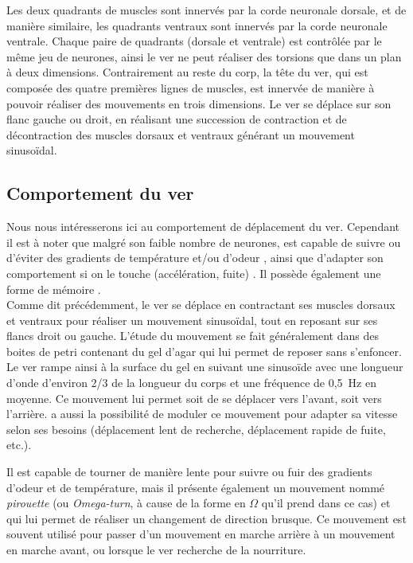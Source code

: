 Les deux quadrants de muscles sont innervés par la corde neuronale dorsale, et
de manière similaire, les quadrants ventraux sont innervés par la corde
neuronale ventrale. Chaque paire de quadrants (dorsale et ventrale) est
contrôlée par le même jeu de neurones, ainsi le ver ne peut réaliser des
torsions que dans un plan à deux dimensions. Contrairement au reste du corp, la
tête du ver, qui est composée des quatre premières lignes de muscles, est
innervée de manière à pouvoir réaliser des mouvements en trois dimensions. Le
ver se déplace sur son flanc gauche ou droit, en réalisant une succession de
contraction et de décontraction des muscles dorsaux et ventraux générant un
mouvement sinusoïdal.


\subsection{Comportement du ver} %
\label{sub:Comportement du ver}

Nous nous intéresserons ici au comportement de déplacement du ver. Cependant il est
à noter que malgré son faible nombre de neurones, \celeg{} est capable de
suivre ou d'éviter des gradients de température et/ou d'odeur
\cite{Ferree1999,Gray2005}, ainsi que d'adapter son comportement si on le touche
(accélération, fuite) \cite{Chalfie1985}. Il possède également une forme de
mémoire \cite{Rankin2005a}.\\

Comme dit précédemment, le ver se déplace en contractant ses muscles dorsaux et
ventraux pour réaliser un mouvement sinusoïdal, tout en reposant sur ses
flancs droit ou gauche. L'étude du mouvement se fait généralement dans des
boites de petri contenant du gel d'agar qui lui permet de reposer
sans s'enfoncer. Le ver rampe ainsi à la surface du gel en suivant une
sinusoïde avec une longueur d'onde d'environ 2/3 de la longueur du corps et 
une fréquence de 0,5~Hz en moyenne\cite{Boyle2009}. Ce mouvement lui permet
soit de se déplacer vers l'avant, soit vers l'arrière. \celeg{} a aussi la
possibilité de moduler ce mouvement pour adapter sa vitesse selon ses besoins
(déplacement lent de recherche, déplacement rapide de fuite, etc.).

Il est capable de tourner de manière lente pour suivre ou fuir des gradients
d'odeur et de température, mais il présente également un mouvement nommé
\textit{pirouette} (ou \textit{Omega-turn}, à cause de la forme en $\Omega$ qu'il
prend dans ce cas) et qui lui permet de réaliser un changement de direction
brusque. Ce mouvement est souvent utilisé pour passer d'un mouvement en marche
arrière à un mouvement en marche avant, ou lorsque le ver recherche de la
nourriture.\\

